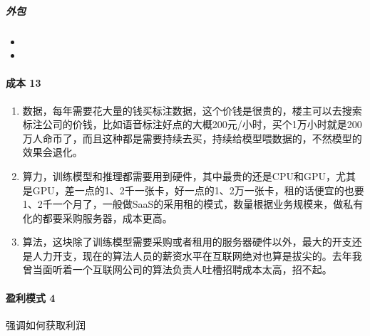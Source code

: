 \documentclass[letterpaper,11pt,english]{sphinxmanual}
\begin{document}
\subparagraph{外包}
\label{\detokenize{chapter_introduction/money:id6}}\begin{itemize}
\item {} 

\item {} 

\end{itemize}


\paragraph{成本 13\sphinxfootnotemark[109]}
\label{\detokenize{chapter_introduction/money:id7}}%
\begin{footnotetext}[109]\sphinxAtStartFootnote
{}
%
\end{footnotetext}\ignorespaces \begin{enumerate}
%
\item {} 
数据，每年需要花大量的钱买标注数据，这个价钱是很贵的，楼主可以去搜索标注公司的价钱，比如语音标注好点的大概200元/小时，买个1万小时就是200万人命币了，而且这种都是需要持续去买，持续给模型喂数据的，不然模型的效果会退化。

\item {} 
算力，训练模型和推理都需要用到硬件，其中最贵的还是CPU和GPU，尤其是GPU，差一点的1、2千一张卡，好一点的1、2万一张卡，租的话便宜的也要1、2千一个月了，一般做SaaS的采用租的模式，数量根据业务规模来，做私有化的都要采购服务器，成本更高。

\item {} 
算法，这块除了训练模型需要采购或者租用的服务器硬件以外，最大的开支还是人力开支，现在的算法人员的薪资水平在互联网绝对也算是拔尖的。去年我曾当面听着一个互联网公司的算法负责人吐槽招聘成本太高，招不起。

\end{enumerate}


\paragraph{盈利模式 4\sphinxfootnotemark[110]}
\label{\detokenize{chapter_introduction/money:id8}}%
\begin{footnotetext}[110]\sphinxAtStartFootnote
{}
%
\end{footnotetext}\ignorespaces 
强调如何获取利润
\end{document}
